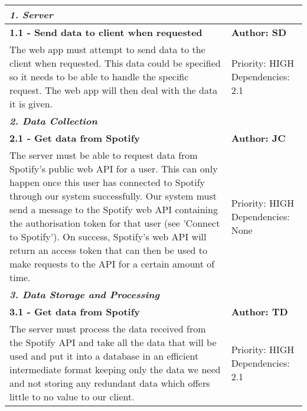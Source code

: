 \documentclass[12pt]{report}
\begin{document}
\begin{comment}
3.2 & Recommend songs based on trends & Author: Fraser Dwyer \\
\multicolumn{2}{l}{The system should be able to recommend songs to the user based off of mood patterns or based off of genre that the user likes to listen to.} & \begin{tabular}[c]{@{}l@{}}Priority: MEDIUM\\ Dependencies: None\end{tabular} \\ \hline
\end{tabular}
\end{table}
\end{comment}

\begin{tabular}{| p{10cm} | p{3cm} |}
\hline
\multicolumn{2}{|l|}{\textbf{\textit{1. Server}}} \\
\hline
\textbf{1.1 - Send data to client when requested} & \textbf{Author: SD} \\
\hline
The web app must attempt to send data to the client when requested. This data could be specified so it needs to be able to handle the specific request. The web app will then deal with the data it is given. & Priority: HIGH Dependencies: 2.1 \\
\hline
\multicolumn{2}{|l|}{\textbf{\textit{2. Data Collection}}} \\
\hline
\textbf{2.1 - Get data from Spotify} & \textbf{Author: JC} \\
\hline
The server must be able to request data from Spotify’s public web API for a user. This can only happen once this user has connected to Spotify through our system successfully. Our system must send a message to the Spotify web API containing the authorisation token for that user (see 'Connect to Spotify'). On success, Spotify's web API will return an access token that can then be used to make requests to the API for a certain amount of time. & Priority: HIGH Dependencies: None \\
\hline
\multicolumn{2}{|l|}{\textbf{\textit{3. Data Storage and Processing}}} \\
\hline
\textbf{3.1 - Get data from Spotify} & \textbf{Author: TD} \\
\hline
The server must process the data received from the Spotify API and take all the data that will be used and put it into a database in an efficient intermediate format keeping only the data we need and not storing any redundant data which offers little to no value to our client. & Priority: HIGH Dependencies: 2.1 \\

\end{tabular}
\end{document}
